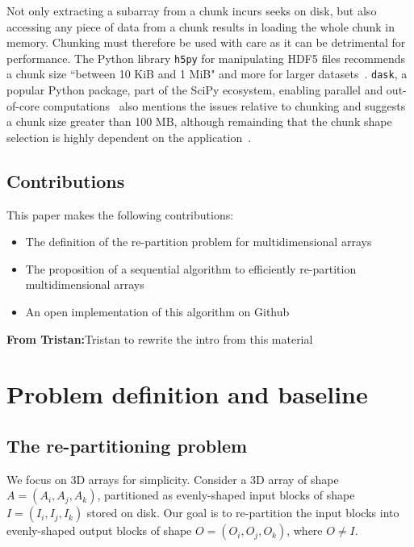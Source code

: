 \documentclass[sigconf, nonacm]{acmart}
\newcommand{\tristan}[1]{\color{orange}\textbf{From Tristan:}#1\color{black}}
\begin{document}
Not only extracting a subarray from a chunk incurs seeks on disk, but also
accessing any piece of data from a chunk results in loading the whole chunk in
memory. Chunking must therefore be used with care as it can be detrimental for
performance. The Python library \texttt{h5py} for manipulating HDF5 files
recommends a chunk size ``between 10 KiB and 1 MiB" and more for larger
datasets~\cite{collette_2014}. \texttt{dask}, a popular Python package, part of
the SciPy ecosystem, enabling parallel and out-of-core
computations~\cite{matthew_rocklin-proc-scipy-2015} also mentions the issues
relative to chunking and suggests a chunk size greater than 100 MB, although
remainding that the chunk shape selection is highly dependent on the
application~\cite{rocklin_bourbeau_2019}.

\subsection{Contributions}
This paper makes the following contributions:
\begin{itemize}
  \item The definition of the re-partition problem for multidimensional arrays
  \item The proposition of a sequential algorithm to efficiently
  re-partition multidimensional arrays
  \item An open implementation of this algorithm on Github
\end{itemize}

\tristan{Tristan to rewrite the intro from this material}

\section{Problem definition and baseline}
\subsection{The re-partitioning problem}
We focus on 3D arrays for simplicity. Consider a 3D array of shape $A =
(A_i, A_j, A_k)$, partitioned as evenly-shaped input blocks of shape $I = (I_i,
I_j, I_k)$ stored on disk. Our goal is to re-partition the input blocks into
evenly-shaped output blocks of shape $O = (O_i, O_j, O_k)$, where $O \neq I$.
\end{document}
